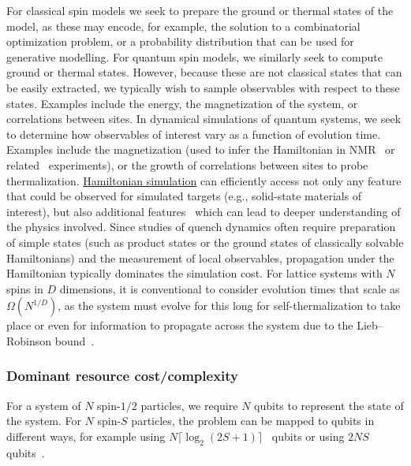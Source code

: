 \begin{refsection}
For classical spin models we seek to prepare the ground or thermal states of the model, as these may encode, for example, the solution to a combinatorial optimization problem, or a probability distribution that can be used for generative modelling. For quantum spin models, we similarly seek to compute ground or thermal states. However, because these are not classical states that can be easily extracted, we typically wish to sample observables with respect to these states. Examples include the energy, the magnetization of the system, or correlations between sites. In dynamical simulations of quantum systems, we seek to determine how observables of interest vary as a function of evolution time. Examples include the magnetization (used to infer the Hamiltonian in NMR~\cite{hogben2011NMRSpinach} or related~\cite{bonfa2021MuonSim} experiments), or the growth of correlations between sites to probe thermalization. \hyperref[prim:HamiltonianSimulation]{Hamiltonian simulation} can efficiently access not only any feature that could be observed for simulated targets (e.g., solid-state materials of interest), but also additional features~\cite{Fraxanet2022decadesQSim} which can lead to deeper understanding of the physics involved. 
Since studies of quench dynamics often require preparation of simple states (such as product states or the ground states of classically solvable Hamiltonians) and the measurement of local observables, propagation under the Hamiltonian typically dominates the simulation cost. For lattice systems with $N$ spins in $D$ dimensions, it is conventional to consider evolution times that scale as $\Omega\left(N^{1/D}\right)$, as the system must evolve for this long for self-thermalization to take place or even for information to propagate across the system due to the Lieb--Robinson bound~\cite{chen2023speedLimits}. 





\subsubsection*{Dominant resource cost/complexity}

For a system of $N$ spin-$1/2$ particles, we require $N$ qubits to represent the state of the system. For $N$ spin-$S$ particles, the problem can be mapped to qubits in different ways, for example using $N \lceil \log_2(2S+1)\rceil$~\cite{sawaya2020ResourceEfficientQuantumDLevel} qubits or using $2NS$ qubits~\cite{mcardle2021Muons}.


\end{refsection}
